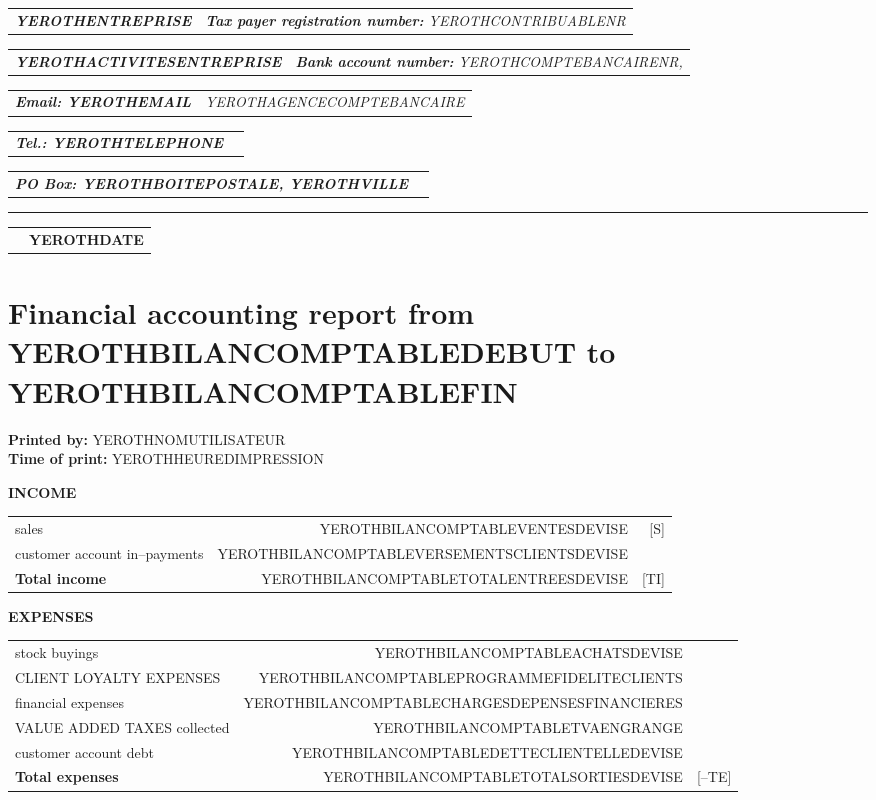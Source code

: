 \documentclass[10pt,YEROTHPAPERSPEC,landscape]{article} %
\makeatletter
\newcommand{\headerrow}[2]
{\begin{tabular*}{\linewidth}{l@{\extracolsep{\fill}}r}
	#1 &
	#2 \\
\end{tabular*}}
\newcommand{\emphbold}[1]{\textbf{\emph{#1}}\xspace}
\makeatother
\begin{document}
\bigskip

\headerrow
	{\emphbold{YEROTHENTREPRISE}}
	{\emph{\textbf{Tax payer registration number:} YEROTHCONTRIBUABLENR}}
\headerrow
	{\emphbold{YEROTHACTIVITESENTREPRISE}}
	{\emph{\textbf{Bank account number:} YEROTHCOMPTEBANCAIRENR,}}
\headerrow
	{\emphbold{Email: YEROTHEMAIL}}
	{\emph{YEROTHAGENCECOMPTEBANCAIRE}}
\headerrow
	{\emphbold{Tel.: YEROTHTELEPHONE}}
	{}
\headerrow
	{\emphbold{PO Box: YEROTHBOITEPOSTALE, YEROTHVILLE}}
	{}
	
\hrule

\headerrow
	{}
	{\textbf{YEROTHDATE}}

\section*{Financial accounting report from YEROTHBILANCOMPTABLEDEBUT to YEROTHBILANCOMPTABLEFIN}

\textbf{Printed by:} YEROTHNOMUTILISATEUR\\
\textbf{Time of print:} YEROTHHEUREDIMPRESSION\\

\vspace{0.3cm}

\vspace{1cm}
\textbf{INCOME}
\begin{table}[!htbp]
\begin{tabular}{lrr}
sales  				&  YEROTHBILANCOMPTABLEVENTESDEVISE  			& [S] \\ 
customer account in--payments  	&  YEROTHBILANCOMPTABLEVERSEMENTSCLIENTSDEVISE  & \\ \hline
\textbf{Total income}  		&  YEROTHBILANCOMPTABLETOTALENTREESDEVISE & [TI] \\	 
\end{tabular}
\end{table}


\vspace{1cm}
\textbf{EXPENSES}
\begin{table}[!htbp]
\begin{tabular}{lrr}
stock buyings  				&  YEROTHBILANCOMPTABLEACHATSDEVISE  							& \\ 
CLIENT LOYALTY EXPENSES 	&  YEROTHBILANCOMPTABLEPROGRAMMEFIDELITECLIENTS  				& \\ 
financial expenses 			&  YEROTHBILANCOMPTABLECHARGESDEPENSESFINANCIERES  				& \\ 
VALUE ADDED TAXES collected	&  YEROTHBILANCOMPTABLETVAENGRANGE 								&  \\
customer account debt\footnotemark  		&  YEROTHBILANCOMPTABLEDETTECLIENTELLEDEVISE 	&  \\ \hline
\textbf{Total expenses}  	&  YEROTHBILANCOMPTABLETOTALSORTIESDEVISE & [--TE] \\
\end{tabular}
\end{table}
\end{document}
